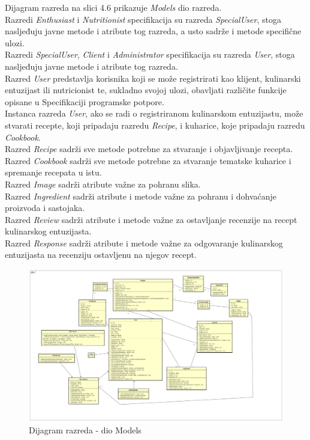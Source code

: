 			
			\eject 	
			
Dijagram razreda na slici 4.6 prikazuje \textit{Models} dio razreda. \\
	Razredi \textit{Enthusiast} i \textit{Nutritionist} specifikacija su razreda \textit{SpecialUser}, stoga nasljeđuju javne metode i atribute tog razreda, a usto sadrže i metode specifične ulozi. \\
	Razredi \textit{SpecialUser}, \textit{Client} i \textit{Administrator} specifikacija su razreda \textit{User}, stoga nasljeđuju javne metode i atribute tog razreda. \\
	Razred \textit{User} predstavlja korisnika koji se može registrirati kao klijent, kulinarski entuzijast ili nutricionist te, sukladno svojoj ulozi, obavljati različite funkcije opisane u Specifikaciji programske potpore. \\
    Instanca razreda \textit{User}, ako se radi o registriranom kulinarskom entuzijastu, može stvarati recepte, koji pripadaju razredu \textit{Recipe}, i kuharice, koje pripadaju razredu \textit{Cookbook}. \\
    Razred \textit{Recipe} sadrži sve metode potrebne za stvaranje i objavljivanje recepta. \\
    Razred \textit{Cookbook} sadrži sve metode potrebne za stvaranje tematske kuharice i spremanje recepata u istu. \\
    Razred \textit{Image} sadrži atribute važne za pohranu slika. \\
    Razred \textit{Ingredient} sadrži atribute i metode važne za pohranu i dohvaćanje proizvoda i sastojaka. \\
    Razred \textit{Review} sadrži atribute i metode važne za ostavljanje recenzije na recept kulinarskog entuzijasta. \\
    Razred \textit{Response} sadrži atribute i metode važne za odgovaranje kulinarskog entuzijasta na recenziju ostavljenu na njegov recept.
			
			
			\begin{figure}[H]
			\includegraphics[scale=0.2]{dijagrami/UML_dijagram_razreda_models.png} %
			\centering
			\caption{Dijagram razreda - dio Models}
			\label{Dijagram razreda - dio Models}
		\end{figure}
		
